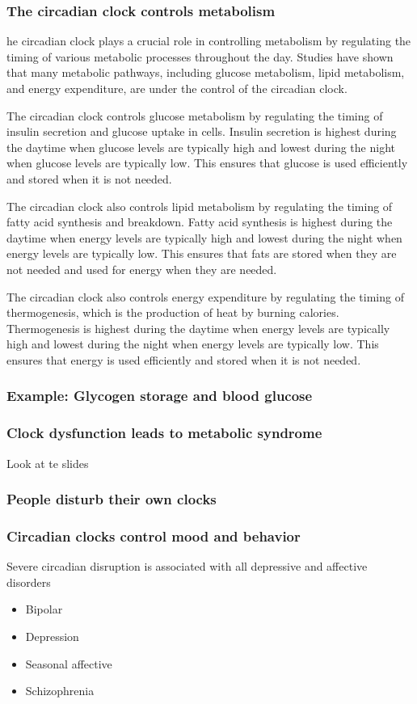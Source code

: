 \begin{itemize}
\begin{itemize}
\subsubsection{The circadian clock controls metabolism}
he circadian clock plays a crucial role in controlling metabolism by regulating the timing of various metabolic processes throughout the day. Studies have shown that many metabolic pathways, including glucose metabolism, lipid metabolism, and energy expenditure, are under the control of the circadian clock.

The circadian clock controls glucose metabolism by regulating the timing of insulin secretion and glucose uptake in cells. Insulin secretion is highest during the daytime when glucose levels are typically high and lowest during the night when glucose levels are typically low. This ensures that glucose is used efficiently and stored when it is not needed.

The circadian clock also controls lipid metabolism by regulating the timing of fatty acid synthesis and breakdown. Fatty acid synthesis is highest during the daytime when energy levels are typically high and lowest during the night when energy levels are typically low. This ensures that fats are stored when they are not needed and used for energy when they are needed.

The circadian clock also controls energy expenditure by regulating the timing of thermogenesis, which is the production of heat by burning calories. Thermogenesis is highest during the daytime when energy levels are typically high and lowest during the night when energy levels are typically low. This ensures that energy is used efficiently and stored when it is not needed.

\subsubsection{Example: Glycogen storage and blood glucose}
\subsubsection{Clock dysfunction leads to metabolic syndrome}
Look at te slides

\subsubsection{People disturb their own clocks}

\subsubsection{Circadian clocks control mood and behavior}
Severe circadian disruption is associated with all depressive and affective disorders
\begin{itemize}
    \item Bipolar
    \item Depression
    \item Seasonal affective
    \item Schizophrenia
\end{itemize}


\end{itemize}
\end{itemize}
